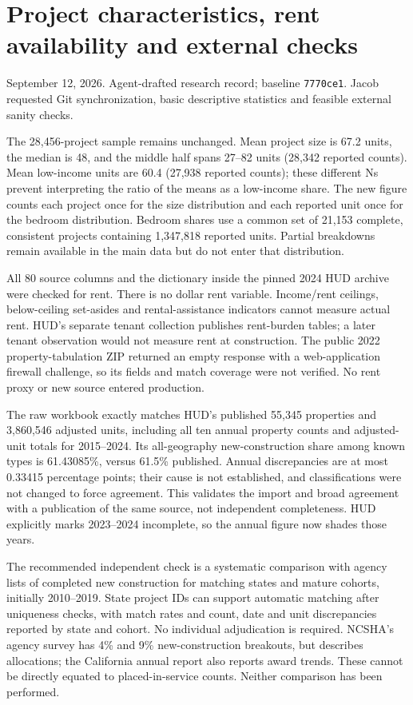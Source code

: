 \documentclass[11pt]{article}
\begin{document}
\section*{Project characteristics, rent availability and external checks}
\noindent September 12, 2026. Agent-drafted research record; baseline
\texttt{7770ce1}. Jacob requested Git synchronization, basic descriptive statistics
and feasible external sanity checks.

The 28,456-project sample remains unchanged. Mean project size is 67.2 units,
the median is 48, and the middle half spans 27--82 units (28,342 reported counts).
Mean low-income units are 60.4 (27,938 reported counts); these different Ns prevent
interpreting the ratio of the means as a low-income share. The new figure counts
each project once for the size distribution and each reported unit once for the
bedroom distribution. Bedroom shares use a common set of 21,153 complete,
consistent projects containing 1,347,818 reported units. Partial breakdowns remain
available in the main data but do not enter that distribution.

All 80 source columns and the dictionary inside the pinned 2024 HUD archive were
checked for rent. There is no dollar rent variable. Income/rent ceilings,
below-ceiling set-asides and rental-assistance indicators cannot measure actual
rent. HUD's separate tenant collection publishes rent-burden tables; a later
tenant observation would not measure rent at construction. The public 2022
property-tabulation ZIP returned an empty response with a web-application firewall
challenge, so its fields and match coverage were not verified. No rent proxy or
new source entered production.

The raw workbook exactly matches HUD's published 55,345 properties and 3,860,546
adjusted units, including all ten annual property counts and adjusted-unit totals
for 2015--2024. Its all-geography new-construction share among known types is
61.43085\%, versus 61.5\% published. Annual discrepancies are at most 0.33415
percentage points; their cause is not established, and classifications were not
changed to force agreement. This validates the import and broad agreement with
a publication of the same source, not independent completeness. HUD explicitly
marks 2023--2024 incomplete, so the annual figure now shades those years.

The recommended independent check is a systematic comparison with agency lists
of completed new construction for matching states and mature cohorts, initially
2010--2019. State project IDs can support automatic matching after uniqueness
checks, with match rates and count, date and unit discrepancies reported by state
and cohort. No individual adjudication is required. NCSHA's agency survey has
4\% and 9\% new-construction breakouts, but describes allocations; the California
annual report also reports award trends. These cannot be directly equated to
placed-in-service counts. Neither comparison has been performed.
\end{document}
